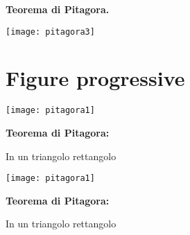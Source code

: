 \documentclass[italian,landscape]{report}
\begin{document}
\begin{firstheadlineitemize}

\item[] \textbf{Teorema di Pitagora.}

\end{firstheadlineitemize}


\pause

\begin{center}
\texttt{[image: pitagora3]}
\end{center}


\section{Figure progressive}

\begin{center}
\texttt{[image: pitagora1]}
\end{center}

\begin{firstheadlineitemize}

\item \textbf{Teorema di Pitagora:}

\pause

\begin{secondheadlineitemize}

\item In un triangolo rettangolo

\end{secondheadlineitemize}

\end{firstheadlineitemize}

\newframe


\begin{center}
\texttt{[image: pitagora1]}
\end{center}

\begin{firstheadlineitemize}

\item \textbf{Teorema di Pitagora:}

\begin{secondheadlineitemize}

\item  In un triangolo rettangolo 

\end{secondheadlineitemize}

\end{firstheadlineitemize}
\end{document}

